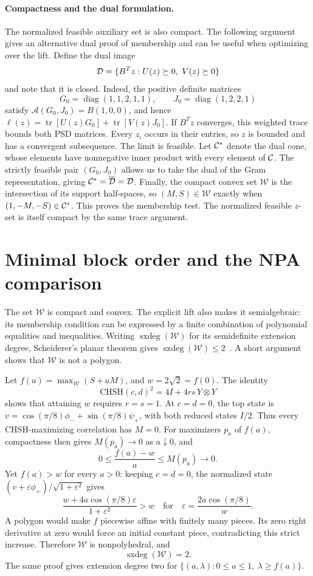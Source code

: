 \documentclass[11pt]{article}
\theoremstyle{remark}\newtheorem{remark}[theorem]{Remark}
\newcommand{\tr}{\operatorname{tr}}\newcommand{\Q}{\mathcal Q}
\newcommand{\W}{\mathcal W}\newcommand{\sxdeg}{\operatorname{sxdeg}}
\begin{document}
\paragraph{Compactness and the dual formulation.}
The normalized feasible auxiliary set is also compact. The following
argument gives an alternative dual proof of membership and can be useful
when optimizing over the lift.
Define the dual image
\[
 {\cal D}=\{B^Tz:U(z)\succeq0,\ V(z)\succeq0\}
\]
and note that it is closed. Indeed, the positive definite matrices
\[
 G_0=\operatorname{diag}(1,1,2,1,1),\qquad
 J_0=\operatorname{diag}(1,2,2,1)
\]
satisfy \(\mathcal A(G_0,J_0)=B(1,0,0)\), and hence
\(\ell(z)=\tr[U(z)G_0]+\tr[V(z)J_0]\).
If \(B^Tz\) converges, this weighted trace bounds both PSD matrices.
Every \(z_i\) occurs in their entries, so \(z\) is bounded and has a convergent
subsequence. The limit is feasible. Let ${\cal C}^*$ denote the dual cone,
whose elements have nonnegative inner product with every element of ${\cal C}$.
The strictly feasible pair \((G_0,J_0)\)
allows us to take the dual of the Gram representation, giving
\({\cal C}^*=\overline{\cal D}={\cal D}\).
Finally, the compact convex set \(\W\) is the intersection of its support
half-spaces, so \((M,S)\in\W\) exactly when \((1,-M,-S)\in{\cal C}^*\).
This proves the membership test. The normalized feasible \(z\)-set is itself
compact by the same trace argument.

\section{Minimal block order and the NPA comparison}

The set \(\W\) is compact and convex. The explicit lift also makes it
semialgebraic: its membership condition can be expressed by a finite
combination of polynomial equalities and inequalities.
Writing $\sxdeg(\W)$ for its semidefinite extension degree, Scheiderer's
planar theorem gives \(\sxdeg(\W)\le2\)~\cite{soc}.
A short argument shows that \(\W\) is not a polygon.

Let \(f(a)=\max_{\W}(S+aM)\), and \(w=2\sqrt2=f(0)\).
The identity
\[
 \mathrm{CHSH}(c,d)^2=4I+4rs\,Y\otimes Y
\]
shows that attaining \(w\) requires \(r=s=1\).
At \(c=d=0\), the top state is
\(v=\cos(\pi/8)\phi_-+\sin(\pi/8)\psi_+\), with both reduced states \(I/2\).
Thus every CHSH-maximizing correlation has \(M=0\).
For maximizers \(p_a\) of \(f(a)\), compactness then gives \(M(p_a)\to0\) as
\(a\downarrow0\), and
\[
 0\le\frac{f(a)-w}{a}\le M(p_a)\longrightarrow0.
\]
Yet \(f(a)>w\) for every \(a>0\): keeping \(c=d=0\), the normalized state
\((v+\varepsilon\phi_+)/\sqrt{1+\varepsilon^2}\) gives
\[
 \frac{w+4a\cos(\pi/8)\varepsilon}{1+\varepsilon^2}>w
 \quad\text{for}\quad \varepsilon=\frac{2a\cos(\pi/8)}w .
\]
A polygon would make \(f\) piecewise affine with finitely many pieces.
Its zero right derivative at zero would force an initial constant piece,
contradicting this strict increase. Therefore \(\W\) is nonpolyhedral, and
\[
 \boxed{\sxdeg(\W)=2.}
\]
The same proof gives extension degree two for
\(\{(a,\lambda):0\le a\le1,\ \lambda\ge f(a)\}\).
\end{document}
